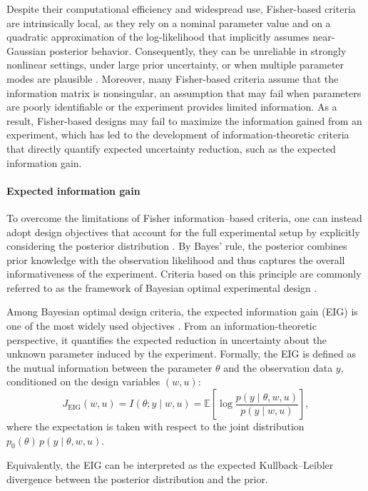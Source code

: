 \documentclass[a4paper,11pt]{article}
\begin{document}
Despite their computational efficiency and widespread use, Fisher-based criteria are intrinsically local, as they rely on a nominal parameter value and on a quadratic approximation of the log-likelihood that implicitly assumes near-Gaussian posterior behavior. Consequently, they can be unreliable in strongly nonlinear settings, under large prior uncertainty, or when multiple parameter modes are plausible \cite{PronzatoPazman2013,chalonerverdinelli1995}. Moreover, many Fisher-based criteria assume that the information matrix is nonsingular, an assumption that may fail when parameters are poorly identifiable or the experiment provides limited information. As a result, Fisher-based designs may fail to maximize the information gained from an experiment, which has led to the development of information-theoretic criteria that directly quantify expected uncertainty reduction, such as the expected information gain.

\paragraph{Expected information gain}

To overcome the limitations of Fisher information--based criteria, one can instead adopt
design objectives that account for the full experimental setup by explicitly considering the
posterior distribution \cite{RaiffaSchlaifer1961,Lindley1972}. By Bayes' rule, the posterior combines prior knowledge with the
observation likelihood and thus captures the overall informativeness of the experiment.
Criteria based on this principle are commonly referred to as the framework of Bayesian
optimal experimental design \cite{chalonerverdinelli1995}.

Among Bayesian optimal design criteria, the expected information gain (EIG) is one of the most widely
used objectives \cite{Ryan2003}. From an information-theoretic perspective, it quantifies the expected
reduction in uncertainty about the unknown parameter induced by the experiment. Formally,
the EIG is defined as the mutual information between the parameter $\theta$ and the
observation data $y$, conditioned on the design variables
$(w,u)$:
\[
J_{\mathrm{EIG}}(w,u)
= I(\theta; y \mid w,u)
= \mathbb{E}
\left[
\log \frac{p(y \mid \theta,w,u)}{p(y \mid w,u)}
\right],
\]
where the expectation is taken with respect to the joint distribution
$p_0(\theta)\,p(y \mid \theta,w,u)$.

Equivalently, the EIG can be interpreted as the expected Kullback--Leibler divergence between
the posterior distribution and the prior.
\end{document}
